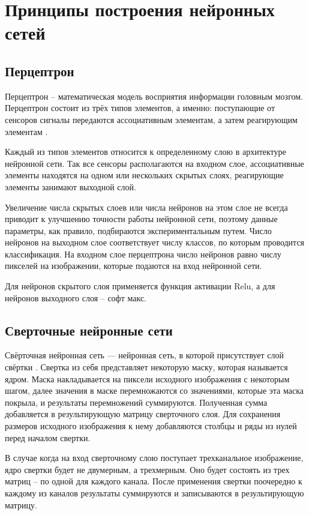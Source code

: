 \section{Принципы построения нейронных сетей}

\subsection{Перцептрон}
Перцептрон – математическая модель восприятия информации головным мозгом. Перцептрон состоит из трёх типов элементов, а именно: поступающие от сенсоров сигналы передаются ассоциативным элементам, а затем реагирующим элементам \cite{perceptron}.

Каждый из типов элементов относится к определенному слою в архитектуре нейронной сети. Так все сенсоры располагаются на входном слое, ассоциативные элементы находятся на одном или нескольких скрытых слоях, реагирующие элементы занимают выходной слой.

Увеличение числа скрытых слоев или числа нейронов на этом слое не всегда приводит к улучшению точности работы нейронной сети, поэтому данные параметры, как правило, подбираются экспериментальным путем. Число нейронов на выходном слое соответствует числу классов, по которым проводится классификация. На входном слое перцептрона число нейронов равно числу пикселей на изображении, которые подаются на вход нейронной сети.

Для нейронов скрытого слоя применяется функция активации Relu, а для нейронов выходного слоя -- софт макс.

\subsection{Сверточные нейронные сети}
Свёрточная нейронная сеть — нейронная сеть, в которой присутствует слой свёртки \cite{svertka}. Свертка из себя представляет некоторую маску, которая называется ядром. Маска накладывается на пиксели исходного изображения с некоторым шагом, далее значения в маске перемножаются со значениями, которые эта маска покрыла, и результаты перемножений суммируются. Полученная сумма добавляется в результирующую матрицу сверточного слоя. Для сохранения размеров исходного изображения к нему добавляются столбцы и ряды из нулей перед началом свертки.

В случае когда на вход сверточному слою поступает трехканальное изображение, ядро свертки будет не двумерным, а трехмерным. Оно будет состоять из трех матриц -- по одной для каждого канала. После применения свертки поочередно к каждому из каналов результаты суммируются и записываются в результирующую матрицу.

